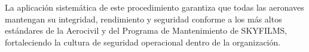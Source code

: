 La aplicación sistemática de este procedimiento garantiza que todas las aeronaves mantengan su integridad, rendimiento y seguridad conforme a los más altos estándares de la Aerocivil y del Programa de Mantenimiento de SKYFILMS, fortaleciendo la cultura de seguridad operacional dentro de la organización.